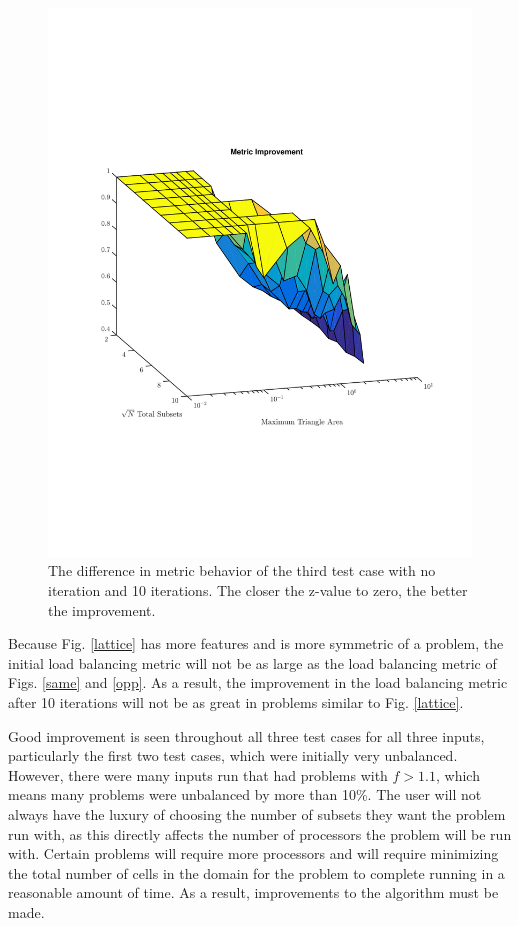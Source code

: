 \documentclass{anstrans}
\begin{document}
\begin{figure}
\centering
\includegraphics[scale=0.5, trim = 0cm 5cm 0cm 5cm,clip]{figures/lattice_diff.pdf}
\caption{The difference in metric behavior of the third test case with no iteration and 10 iterations. The closer the z-value to zero, the better the improvement.}
\label{latticediff}
\end{figure}

Because Fig. \ref{lattice} has more features and is more symmetric of a problem, the initial load balancing metric will not be as large as the load balancing metric of Figs. \ref{same} and \ref{opp}. As a result, the improvement in the load balancing metric after 10 iterations will not be as great in problems similar to Fig. \ref{lattice}. 

Good improvement is seen throughout all three test cases for all three inputs, particularly the first two test cases, which were initially very unbalanced. However, there were many inputs run that had problems with $f > 1.1$, which means many problems were unbalanced by more than 10\%. The user will not always have the luxury of choosing the number of subsets they want the problem run with, as this directly affects the number of processors the problem will be run with. Certain problems will require more processors and will require minimizing the total number of cells in the domain for the problem to complete running in a reasonable amount of time. As a result, improvements to the algorithm must be made. 
\end{document}
